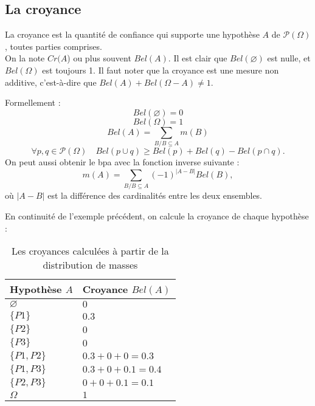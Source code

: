 \subsection{La croyance}

La croyance est la quantité de confiance qui supporte une hypothèse $A$ de
$\mathcal{P}(\Omega)$, toutes parties comprises.\\
On la note $Cr(A$) ou plus souvent $Bel(A)$. Il est clair que $Bel(\varnothing)$
est nulle, et $Bel(\Omega)$ est toujours 1. Il faut noter que la croyance est une
mesure non additive, c’est-à-dire que $Bel(A) + Bel(\Omega - A) \neq 1$.

Formellement :
\begin{equation}
Bel(\varnothing)=0
\end{equation}
\begin{equation}
Bel(\Omega)=1
\end{equation}
\begin{equation}
Bel(A) = \sum_{B \slash B \subseteq A} m(B)
\end{equation}
\begin{equation}
\forall p,q \in \mathcal{P}(\Omega) \quad Bel(p \cup q) \geq Bel(p) + Bel(q) - Bel(p \cap q).
\end{equation}
On peut aussi obtenir le bpa avec la fonction inverse suivante :
\begin{equation}
m(A) = \sum_{B \slash B \subseteq A} (-1)^{|A-B|} Bel(B),
\end{equation}
où $|A-B|$ est la différence des cardinalités entre les deux ensembles.

\begin{exemple}
En continuité de l'exemple précédent, on calcule la croyance de chaque hypothèse :

\begin{table}[H]
\centering
\begin{tabular}{|l|l|}
\hline
Hypothèse $A$ & Croyance $Bel(A)$\\
\hline
$\varnothing$ & $0$ \\
\hline
$\{P1\}$ & $0.3$ \\
\hline
$\{P2\}$ & $0$ \\
\hline
$\{P3\}$ & $0$ \\
\hline
$\{P1, P2\}$ & $0.3 + 0 + 0 = 0.3$ \\
\hline
$\{P1, P3\}$ & $0.3 + 0 + 0.1 = 0.4$ \\
\hline
$\{P2, P3\}$ & $0 + 0 + 0.1 = 0.1$ \\
\hline
$\Omega$ & $1$ \\
\hline
\end{tabular}
\caption{Les croyances calculées à partir de la distribution de masses}
\end{table}
\end{exemple}

